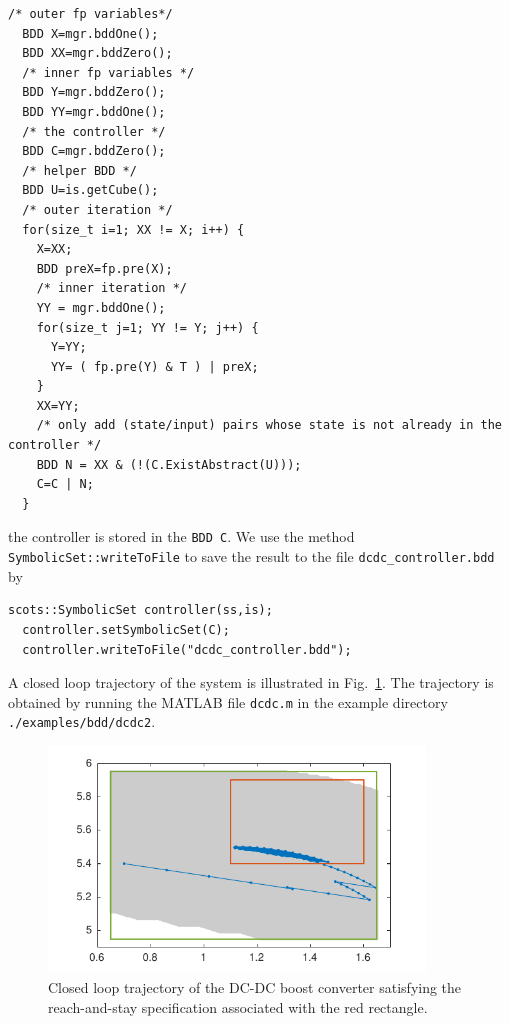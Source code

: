 \documentclass[a4paper]{amsart}
\begin{document}
\begin{lstlisting}[basicstyle=\footnotesize\ttfamily]
  /* outer fp variables*/
  BDD X=mgr.bddOne();
  BDD XX=mgr.bddZero();
  /* inner fp variables */
  BDD Y=mgr.bddZero();
  BDD YY=mgr.bddOne();
  /* the controller */
  BDD C=mgr.bddZero();
  /* helper BDD */
  BDD U=is.getCube();
  /* outer iteration */
  for(size_t i=1; XX != X; i++) {
    X=XX;
    BDD preX=fp.pre(X);
    /* inner iteration */
    YY = mgr.bddOne();
    for(size_t j=1; YY != Y; j++) {
      Y=YY;                                                                                                                                                                                                                                                                                                                                                                
      YY= ( fp.pre(Y) & T ) | preX;
    }
    XX=YY;
    /* only add (state/input) pairs whose state is not already in the controller */
    BDD N = XX & (!(C.ExistAbstract(U)));
    C=C | N;
  }
\end{lstlisting}
the controller is stored in the {\tt\small BDD C}. We use the method {\tt\small SymbolicSet::writeToFile} to save the result to the file {\tt\small dcdc\_controller.bdd} by
\begin{lstlisting}[basicstyle=\footnotesize\ttfamily]
  scots::SymbolicSet controller(ss,is);
  controller.setSymbolicSet(C);
  controller.writeToFile("dcdc_controller.bdd");
\end{lstlisting}
A closed loop trajectory of the system is illustrated in
Fig.~\ref{f:reachandstay}. The trajectory is obtained by running the MATLAB file
{\tt\small dcdc.m} in the example directory {\tt\small ./examples/bdd/dcdc2}.
\begin{figure}[h]
	\centering
  \includegraphics[width=10cm]{figures/dcdcreachandstay}
\caption{Closed loop trajectory of the DC-DC boost converter satisfying
the reach-and-stay specification associated with the red
rectangle.}\label{f:reachandstay}
\end{figure}
\end{document}
